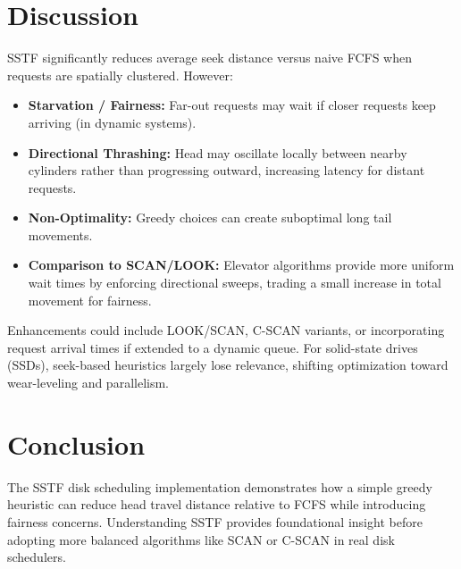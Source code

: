 \documentclass[12pt,a4paper]{article}
\begin{document}
\section{Discussion}
SSTF significantly reduces average seek distance versus naive FCFS when requests are spatially clustered. However:
\begin{itemize}
    \item \textbf{Starvation / Fairness:} Far-out requests may wait if closer requests keep arriving (in dynamic systems).
    \item \textbf{Directional Thrashing:} Head may oscillate locally between nearby cylinders rather than progressing outward, increasing latency for distant requests.
    \item \textbf{Non-Optimality:} Greedy choices can create suboptimal long tail movements.
    \item \textbf{Comparison to SCAN/LOOK:} Elevator algorithms provide more uniform wait times by enforcing directional sweeps, trading a small increase in total movement for fairness.
\end{itemize}
Enhancements could include LOOK/SCAN, C-SCAN variants, or incorporating request arrival times if extended to a dynamic queue. For solid-state drives (SSDs), seek-based heuristics largely lose relevance, shifting optimization toward wear-leveling and parallelism.

\section{Conclusion}
The SSTF disk scheduling implementation demonstrates how a simple greedy heuristic can reduce head travel distance relative to FCFS while introducing fairness concerns. Understanding SSTF provides foundational insight before adopting more balanced algorithms like SCAN or C-SCAN in real disk schedulers.
\end{document}
